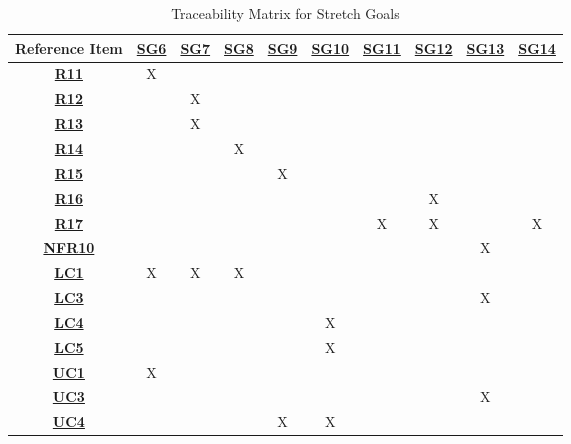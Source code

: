 \begin{table}[ht]
\centering
\begin{tabular}{|c|c|c|c|c|c|c|c|c|c|}
\hline
\textbf{Reference Item} &
\hyperref[G_local_multiplayer]{\textbf{SG6}} &
\hyperref[G_singleplayer]{\textbf{SG7}} &
\hyperref[G_matchmaking]{\textbf{SG8}} &
\hyperref[G_saving]{\textbf{SG9}} &
\hyperref[G_customization2]{\textbf{SG10}} &
\hyperref[G_skins]{\textbf{SG11}} &
\hyperref[G_stats]{\textbf{SG12}} &
\hyperref[G_platforms]{\textbf{SG13}} &
\hyperref[G_highlights]{\textbf{SG14}} \\ \hline
\hyperref[R11]{\textbf{R11}} &X & & & & & & & & \\ \hline
\hyperref[R12]{\textbf{R12}} & &X & & & & & & & \\ \hline
\hyperref[R13]{\textbf{R13}} & &X & & & & & & & \\ \hline
\hyperref[R14]{\textbf{R14}} & & &X & & & & & & \\ \hline
\hyperref[R15]{\textbf{R15}} & & & &X & & & & & \\ \hline
\hyperref[R16]{\textbf{R16}} & & & & & & &X & & \\ \hline
\hyperref[R17]{\textbf{R17}} & & & & & &X &X & &X \\ \hline
\hyperref[NFR10]{\textbf{NFR10}} & & & & & & & &X & \\ \hline
\hyperref[LC_find_opp]{\textbf{LC1}} &X &X &X & & & & & & \\ \hline
\hyperref[LC_platforms]{\textbf{LC3}} & & & & & & & &X & \\ \hline
\hyperref[LC_score_calc]{\textbf{LC4}} & & & & &X & & & & \\ \hline
\hyperref[LC_num_players]{\textbf{LC5}} & & & & &X & & & & \\ \hline
\hyperref[ULC_multiplayer]{\textbf{UC1}} &X & & & & & & & & \\ \hline
\hyperref[ULC_godot]{\textbf{UC3}} & & & & & & & &X & \\ \hline
\hyperref[ULC_customization]{\textbf{UC4}} & & & &X &X & & & & \\ \hline
\end{tabular}
\caption{Traceability Matrix for Stretch Goals}
\label{table:stretch_goals_traceability}
\end{table}